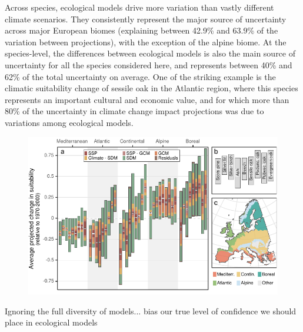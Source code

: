 \documentclass[11pt,letter]{article}
\begin{document}
Across species, ecological models drive more variation than vastly different climate scenarios. They consistently represent the major source of uncertainty across major European biomes (explaining between 42.9\% and 63.9\% of the variation between projections), with the exception of the alpine biome. At the species-level, the differences between ecological models is also the main source of uncertainty for all the species considered here, and represents between 40\% and 62\% of the total uncertainty on average. One of the striking example is the climatic suitability change of sessile oak in the Atlantic region, where this species represents an important cultural and economic value, and for which more than 80\% of the uncertainty in climate change impact projections was due to variations among ecological models. 

\begin{figure}
	\centering
	\includegraphics[width=0.7\linewidth]{../newfigures/files/figure1}
	\caption{}
	\label{fig:anovaspecies}
\end{figure}

Ignoring the full diversity of models... bias our true level of confidence we should place in ecological models
\end{document}
